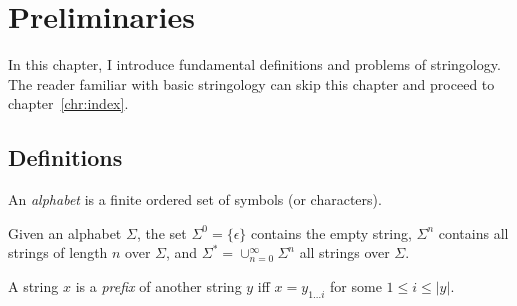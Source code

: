 
\chapter{Preliminaries}

In this chapter, I introduce fundamental definitions and problems of stringology.
The reader familiar with basic stringology can skip this chapter and proceed to chapter~\ref{chr:index}.

\section{Definitions}


\begin{definition}
\label{def:alpha}
An \emph{alphabet} is a finite ordered set of symbols (or characters).
\end{definition}


\begin{definition}
Given an alphabet $\Sigma$, the set $\Sigma^0=\{ \epsilon \}$ contains the empty string, $\Sigma^n$ contains all strings of length $n$ over $\Sigma$, and $\Sigma^* = \cup_{n=0}^{\infty}{\Sigma^n}$ all strings over $\Sigma$.
\end{definition}


\begin{definition}
A string $x$ is a \emph{prefix} of another string $y$ iff $x = y_{1 \dots i}$ for some $1 \leq i \leq |y|$.
\end{definition}

